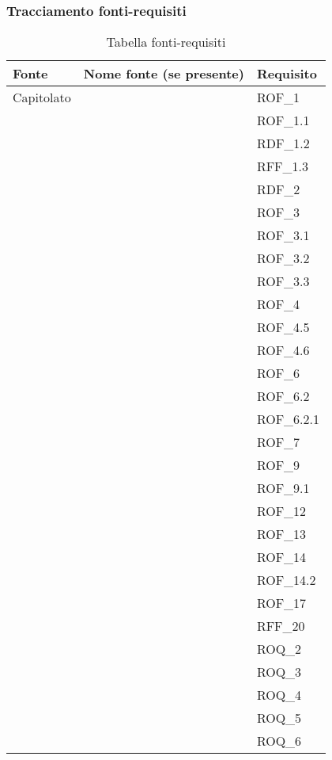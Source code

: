 \subsubsection{Tracciamento fonti-requisiti}
\begin{xltabular}{\textwidth}{ p{0.3\textwidth} | X | p{0.2\textwidth} }
    \textbf{\color{white} Fonte} & \textbf{\color{white} Nome fonte (se presente)} & \textbf{\color{white} Requisito} \\ 
    \endhead

    \caption{Tabella fonti-requisiti}
    \endlastfoot

    Capitolato & & ROF\_1\\
    &&ROF\_1.1\\ 
    &&RDF\_1.2\\ 
    &&RFF\_1.3\\ 
    &&RDF\_2\\ 
    &&ROF\_3\\ 
    &&ROF\_3.1\\ 
    &&ROF\_3.2\\ 
    &&ROF\_3.3\\ 
    &&ROF\_4\\ 
    &&ROF\_4.5\\ 
    &&ROF\_4.6\\ 
    &&ROF\_6\\ 
    &&ROF\_6.2\\ 
    &&ROF\_6.2.1\\ 
    &&ROF\_7\\ 
    &&ROF\_9\\ 
    &&ROF\_9.1\\ 
    &&ROF\_12\\ 
    &&ROF\_13\\ 
    &&ROF\_14\\ 
    &&ROF\_14.2\\ 
    &&ROF\_17\\ 
    &&RFF\_20\\ 
    &&ROQ\_2\\ 
    &&ROQ\_3\\ 
    &&ROQ\_4\\ 
    &&ROQ\_5\\ 
    &&ROQ\_6\\


\end{xltabular}
